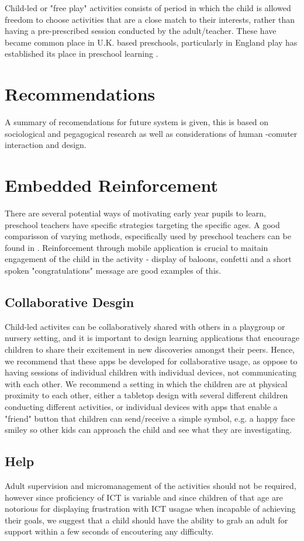 \documentclass{sig-alternate}
\begin{document}
Child-led or "free play" activities \cite{bredekamp1987developmentally} consists of period in which the child is allowed freedom to choose activities that are a close match to their interests, rather than having a pre-prescribed session conducted by the adult/teacher. These have became common place in U.K. based preschools, particularly in England play has established its place in preschool learning \cite{DiChilvers}.



\section{Recommendations}
A summary of recomendations for future system is given, this is based on sociological and pegagogical research as well as considerations of human -comuter interaction and design. 

\section*{Embedded Reinforcement}
There are several potential ways of motivating early year pupils to learn, preschool teachers have specific strategies targeting the specific ages. A good comparisson of varying methods, especifically used by preschool teachers can be found in \cite{hanley2009influencing}. Reinforcement through mobile application is crucial to maitain engagement of the child in the activity - display of baloons, confetti and a short spoken "congratulations" message are good examples of this.
\subsection*{Collaborative Desgin} 
Child-led activites can be collaboratively shared with others in a playgroup or nursery setting, and it is important to design learning applications that encourage children to share their excitement in new discoveries amongst their peers. Hence, we recommend that these apps be developed for collaborative usage, as oppose to having sessions of individual children with individual devices, not communicating with each other. We recommend a setting in which the children are at physical proximity to each other,  either a tabletop design with several different children conducting different activities, or individual devices with apps that enable a "friend" button that children can send/receive a simple symbol, e.g. a happy face smiley so other kids can approach the child and see what they are investigating. 
\subsection*{Help}
Adult supervision and micromanagement of the activities should not be required, however since proficiency of ICT is variable and since children of that age are notorious for displaying frustration with ICT  usagae when incapable of achieving their goals, we suggest that a child should have the ability to grab an adult for support within a few seconds of encoutering any difficulty.
\end{document}
